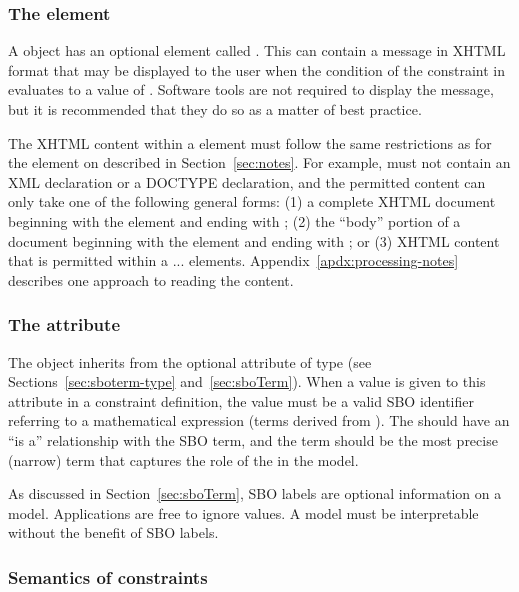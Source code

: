 \subsubsection{The  element}
\label{sec:constraint-message}

A \Constraint object has an optional element called
.  This can contain a message in XHTML format that
may be displayed to the user when the condition of the constraint
in  evaluates to a value of .  Software
tools are not required to display the message, but it is
recommended that they do so as a matter of best practice.

The XHTML content within a  element must follow the
same restrictions as for the  element on \SBase
described in Section~\ref{sec:notes}.  For example,
 must not contain an XML declaration or a DOCTYPE
declaration, and the permitted content can only take one of the
following general forms: (1) a complete XHTML document beginning
with the element  and ending with ;
(2) the ``body'' portion of a document beginning with the element
 and ending with ; or (3) XHTML
content that is permitted within a  ...
 elements.    Appendix~\ref{apdx:processing-notes}
describes one approach to reading the  content.


\subsubsection{The  attribute}
\label{sec:constraint-sboterm}

The \Constraint object inherits from \SBase the optional  attribute of
type  (see Sections~\ref{sec:sboterm-type}
and~\ref{sec:sboTerm}).  When a value is given to this attribute in a
constraint definition, the value must be a valid SBO identifier
referring to a mathematical expression (\ie terms derived from
\sbomathformula).  The \Constraint should have an ``is a''
relationship with the SBO term, and the term should be the most
precise (narrow) term that captures the role of the \Constraint in
the model.

As discussed in Section~\ref{sec:sboTerm}, SBO labels are optional
information on a model.  Applications are free to ignore
 values.  A model must be interpretable without the
benefit of SBO labels.


\subsubsection{Semantics of constraints}
\label{sec:constraint-semantics}

